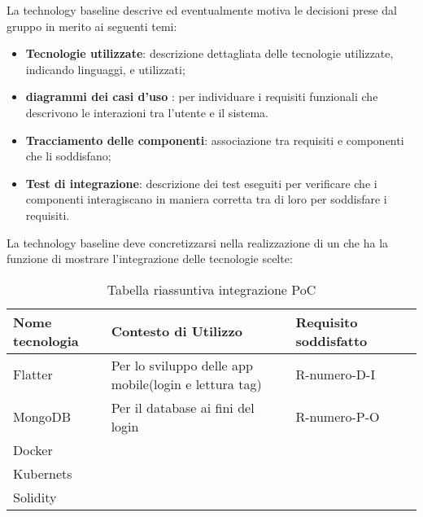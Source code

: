 La technology baseline descrive ed eventualmente motiva le decisioni prese dal gruppo \Gruppo{} in merito ai seguenti temi:

\begin{itemize}
    \item \textbf{Tecnologie utilizzate}: descrizione dettagliata delle tecnologie utilizzate, indicando linguaggi,   e  utilizzati;
    \item \textbf{diagrammi dei casi d'uso }: per individuare i requisiti funzionali che descrivono le interazioni tra l'utente e il sistema.
    \item \textbf{Tracciamento delle componenti}: associazione tra requisiti e componenti che li soddisfano;
    \item \textbf{Test di integrazione}: descrizione dei test eseguiti per verificare che i componenti interagiscano in maniera corretta tra di loro per soddisfare i requisiti.
\end{itemize}

La technology baseline deve concretizzarsi nella realizzazione di un \emph{} che ha la funzione di mostrare l'integrazione delle tecnologie scelte:

\begin{longtable}{ C{2.5cm} C{3cm} C{7cm} C{3.5cm} }
    \caption{Tabella riassuntiva integrazione PoC}                                                                                 \\
    \rowcolor{\primaryColor}
    \textcolor{\secondaryColor}{\textbf{Nome tecnologia}} & \textcolor{\secondaryColor}{\textbf{Contesto di Utilizzo}} & \textcolor{\secondaryColor}{\textbf{Requisito soddisfatto}}\\ \endhead
    {Flatter} & {Per lo sviluppo delle app mobile(login e lettura tag)} & { R-numero-D-I } \\
    {MongoDB} & {Per il database ai fini del login} & { R-numero-P-O} \\
    {Docker} & {} & {}\\
    {Kubernets} & {} & {}\\
    {Solidity} & {} & {} \\
\end{longtable}
